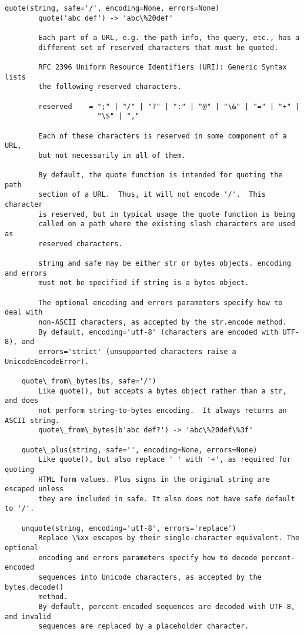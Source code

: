 \documentclass[11pt]{article}
\begin{document}
\begin{Verbatim}[commandchars=\\\{\}]
    quote(string, safe='/', encoding=None, errors=None)
        quote('abc def') -> 'abc\%20def'
        
        Each part of a URL, e.g. the path info, the query, etc., has a
        different set of reserved characters that must be quoted.
        
        RFC 2396 Uniform Resource Identifiers (URI): Generic Syntax lists
        the following reserved characters.
        
        reserved    = ";" | "/" | "?" | ":" | "@" | "\&" | "=" | "+" |
                      "\$" | ","
        
        Each of these characters is reserved in some component of a URL,
        but not necessarily in all of them.
        
        By default, the quote function is intended for quoting the path
        section of a URL.  Thus, it will not encode '/'.  This character
        is reserved, but in typical usage the quote function is being
        called on a path where the existing slash characters are used as
        reserved characters.
        
        string and safe may be either str or bytes objects. encoding and errors
        must not be specified if string is a bytes object.
        
        The optional encoding and errors parameters specify how to deal with
        non-ASCII characters, as accepted by the str.encode method.
        By default, encoding='utf-8' (characters are encoded with UTF-8), and
        errors='strict' (unsupported characters raise a UnicodeEncodeError).
    
    quote\_from\_bytes(bs, safe='/')
        Like quote(), but accepts a bytes object rather than a str, and does
        not perform string-to-bytes encoding.  It always returns an ASCII string.
        quote\_from\_bytes(b'abc def?') -> 'abc\%20def\%3f'
    
    quote\_plus(string, safe='', encoding=None, errors=None)
        Like quote(), but also replace ' ' with '+', as required for quoting
        HTML form values. Plus signs in the original string are escaped unless
        they are included in safe. It also does not have safe default to '/'.
    
    unquote(string, encoding='utf-8', errors='replace')
        Replace \%xx escapes by their single-character equivalent. The optional
        encoding and errors parameters specify how to decode percent-encoded
        sequences into Unicode characters, as accepted by the bytes.decode()
        method.
        By default, percent-encoded sequences are decoded with UTF-8, and invalid
        sequences are replaced by a placeholder character.
        

\end{Verbatim}
\end{document}
